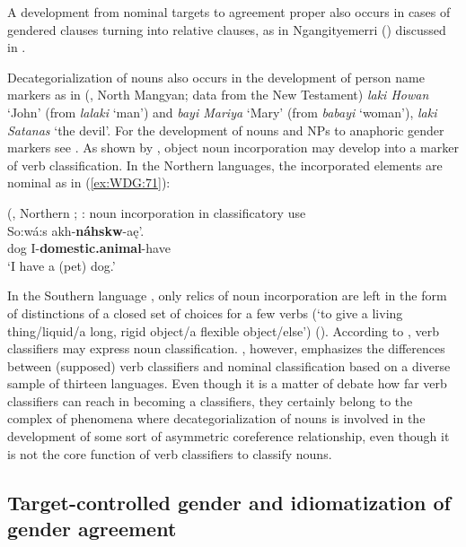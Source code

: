\documentclass[output=collectionpaper]{langsci/langscibook}
\begin{document}
A development from nominal targets to agreement proper also occurs in cases of gendered clauses turning into relative clauses, as in Ngan\textquotesingle{}gityemerri (\citealt{Reid1997}) discussed in .

Decategorialization of nouns also occurs in the development of person name markers as in  (, North Mangyan; data from the New Testament) \textit{laki Howan} `John' (from \textit{lalaki} `man') and \textit{bayi Mariya} `Mary' (from \textit{babayi} `woman'), \textit{laki Satanas} `the devil'. For the development of nouns and NPs to anaphoric gender markers see . As shown by \cite{Mithun1986}, object noun incorporation may develop into a marker of verb classification. In the Northern  languages, the incorporated elements are nominal as in (\ref{ex:WDG:71}):

\ea\label{ex:WDG:71}
 (, Northern ; \citealt{Mithun1986}: noun incorporation in classificatory use\\
\gll So:wá:s	akh-\textbf{náhskw}-aę'.\\
dog	I-\textbf{domestic.animal}-have\\
\glt `I have a (pet) dog.'\\
\z

In the Southern  language , only relics of noun incorporation are left in the form of distinctions of a closed set of choices for a few verbs (`to give a living thing/liquid/a long, rigid object/a flexible object/else') (\citealt[392]{Mithun1986}). According to \cite{Mithun1986}, verb classifiers may express noun classification. \cite{Passer2016a}, however, emphasizes the differences between (supposed) verb classifiers and nominal classification based on a diverse sample of thirteen languages. Even though it is a matter of debate how far verb classifiers can reach in becoming a classifiers, they certainly belong to the complex of phenomena where decategorialization of nouns is involved in the development of some sort of asymmetric coreference relationship, even though it is not the core function of verb classifiers to classify nouns.

  \subsection{Target-controlled gender and idiomatization of gender agreement}
\label{sec:WDG:7.7}
\end{document}
